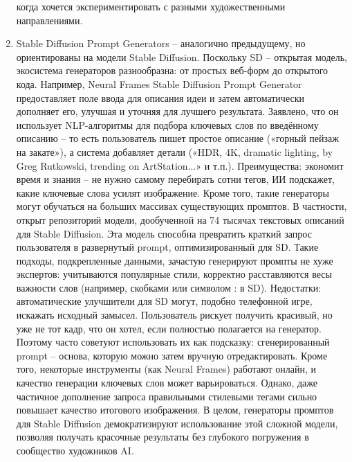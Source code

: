 \begin{enumerate}[label=\arabic*.]
когда хочется экспериментировать с разными художественными направлениями.

\item Stable Diffusion Prompt Generators – аналогично предыдущему, но ориентированы на модели Stable Diffusion. Поскольку SD – открытая модель, экосистема генераторов разнообразна: от простых веб-форм до открытого кода. Например, Neural Frames Stable Diffusion Prompt Generator предоставляет поле ввода для описания идеи и затем автоматически дополняет его, улучшая и уточняя для лучшего результата\cite{neuralframes:sdprompt}.  Заявлено, что он использует NLP-алгоритмы для подбора ключевых слов по введённому описанию  – то есть пользователь пишет простое описание («горный пейзаж на закате»), а система добавляет детали («HDR, 4K, dramatic lighting, by Greg Rutkowski, trending on ArtStation...» и т.п.)\cite{feedough:sdprompt}. Преимущества: экономит время и знания – не нужно самому перебирать сотни тегов, ИИ подскажет, какие ключевые слова усилят изображение. Кроме того, такие генераторы могут обучаться на больших массивах существующих промптов. В частности, открыт репозиторий модели, дообученной на 74 тысячах текстовых описаний для Stable Diffusion\cite{ollama:sdprompt}. Эта модель способна превратить краткий запрос пользователя в развернутый prompt, оптимизированный для SD\cite{ollama:sdprompt}. Такие подходы, подкрепленные данными, зачастую генерируют промпты не хуже экспертов: учитываются популярные стили, корректно расставляются весы важности слов (например, скобками или символом : в SD). Недостатки: автоматические улучшители для SD могут, подобно телефонной игре, искажать исходный замысел. Пользователь рискует получить красивый, но уже не тот кадр, что он хотел, если полностью полагается на генератор. Поэтому часто советуют использовать их как подсказку: сгенерированный prompt – основа, которую можно затем вручную отредактировать. Кроме того, некоторые инструменты (как Neural Frames) работают онлайн, и качество генерации ключевых слов может варьироваться. Однако, даже частичное дополнение запроса правильными стилевыми тегами сильно повышает качество итогового изображения\cite{feedough:sdprompt}. В целом, генераторы промптов для Stable Diffusion демократизируют использование этой сложной модели, позволяя получать красочные результаты без глубокого погружения в сообщество художников AI.


\end{enumerate}
